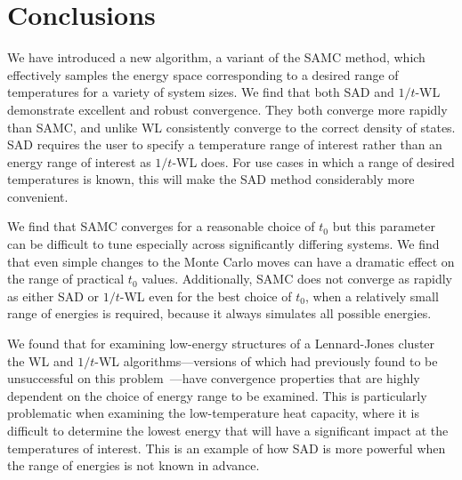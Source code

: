 \documentclass[letterpaper,twocolumn,amsmath,amssymb,pre,aps,10pt]{revtex4-1}
\begin{document}

\section{Conclusions}
We have introduced a new algorithm, a variant of the SAMC method, which
effectively samples the
energy space corresponding to a desired range of temperatures for a
variety of system sizes.
%
We find that both SAD and $1/t$-WL demonstrate excellent and robust
convergence.
They both converge more rapidly than SAMC, and unlike WL consistently
converge to the correct density of states. SAD requires
the user to specify a temperature range of interest rather than an
energy range of interest as $1/t$-WL does.  For use cases in which
a range of desired temperatures is known, this will make the SAD method
considerably more convenient.

We find that SAMC converges for a reasonable choice of
$t_0$ but this parameter can be difficult to tune especially across
significantly differing systems.  We find that even simple
changes to the Monte Carlo moves can have a dramatic effect on the
range of practical $t_0$ values.  Additionally, SAMC does not
converge as rapidly as either SAD or $1/t$-WL even for the best choice of $t_0$,
when a relatively small range of energies is required, because it always
simulates all possible energies.

We found that for examining low-energy structures of a Lennard-Jones
cluster the WL and $1/t$-WL algorithms---versions of which had
previously found to be unsuccessful on this problem~\cite{poulain2006performances}---have
convergence properties that are highly dependent on the choice of
energy range to be examined.  This is particularly problematic when
examining the low-temperature heat capacity, where it is difficult to
determine the lowest energy that will have a significant impact at the
temperatures of interest. This is an example of how SAD is more powerful when the range
of energies is not known in advance.



\end{document}
